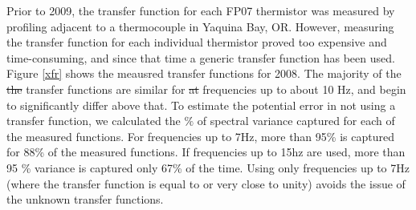 \documentclass{ametsoc}
\providecommand{\DIFdel}[1]{{\protect\color{red}\sout{#1}}}                      %
\providecommand{\DIFdelbegin}{} %
\providecommand{\DIFdelend}{} %
\begin{document}
Prior to 2009, the transfer function for each FP07 thermistor was measured by profiling adjacent to a thermocouple in Yaquina Bay, OR. However, measuring the transfer function for each individual thermistor proved too expensive and time-consuming, and since that time a generic transfer function has been used. Figure \ref{xfr} shows the meausred transfer functions for 2008. The majority of the \DIFdelbegin \DIFdel{the }\DIFdelend transfer functions are similar for \DIFdelbegin \DIFdel{at }\DIFdelend frequencies up to about 10 Hz, and begin to significantly differ above that. To estimate the potential error in not using a transfer function, we calculated the $\%$ of spectral variance captured for each of the measured functions. For frequencies up to 7Hz, more than 95\% is captured for 88\% of the measured functions. If frequencies up to 15hz are used, more than 95 \% variance is captured only 67\% of the time. Using only frequencies up to 7Hz (where the transfer function is equal to or very close to unity) avoids the issue of the unknown transfer functions.






%
%
%
 
 
\end{document}
